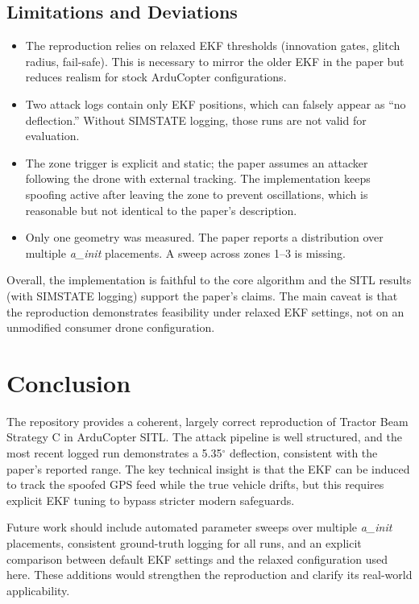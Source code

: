 \documentclass[12pt, a4paper]{article}
\begin{document}
\subsection{Limitations and Deviations}
\begin{itemize}[noitemsep]
  \item The reproduction relies on relaxed EKF thresholds (innovation gates, glitch radius, fail-safe). This is necessary to mirror the older EKF in the paper but reduces realism for stock ArduCopter configurations.
  \item Two attack logs contain only EKF positions, which can falsely appear as ``no deflection.'' Without SIMSTATE logging, those runs are not valid for evaluation.
  \item The zone trigger is explicit and static; the paper assumes an attacker following the drone with external tracking. The implementation keeps spoofing active after leaving the zone to prevent oscillations, which is reasonable but not identical to the paper's description.
  \item Only one geometry was measured. The paper reports a distribution over multiple \textit{a\_init} placements. A sweep across zones 1--3 is missing.
\end{itemize}

Overall, the implementation is faithful to the core algorithm and the SITL results (with SIMSTATE logging) support the paper's claims. The main caveat is that the reproduction demonstrates feasibility under relaxed EKF settings, not on an unmodified consumer drone configuration.

\section{Conclusion}

The repository provides a coherent, largely correct reproduction of Tractor Beam Strategy C in ArduCopter SITL. The attack pipeline is well structured, and the most recent logged run demonstrates a 5.35$^\circ$ deflection, consistent with the paper's reported range. The key technical insight is that the EKF can be induced to track the spoofed GPS feed while the true vehicle drifts, but this requires explicit EKF tuning to bypass stricter modern safeguards.

Future work should include automated parameter sweeps over multiple \textit{a\_init} placements, consistent ground-truth logging for all runs, and an explicit comparison between default EKF settings and the relaxed configuration used here. These additions would strengthen the reproduction and clarify its real-world applicability.

\end{document}
